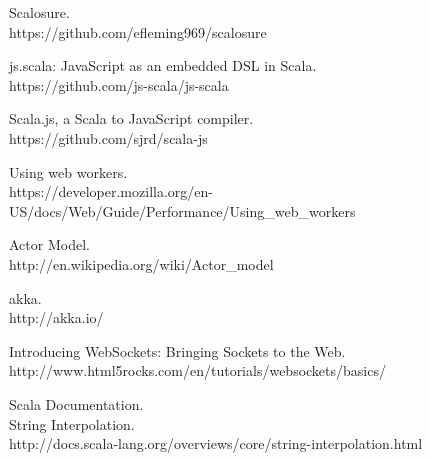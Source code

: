 \begin{thebibliography}{99}
  Scalosure.\\
  https://github.com/efleming969/scalosure
	
  js.scala: JavaScript as an embedded DSL in Scala.\\
  https://github.com/js-scala/js-scala
	
  Scala.js, a Scala to JavaScript compiler.\\
  https://github.com/sjrd/scala-js
	
  Using web workers.\\
  https://developer.mozilla.org/en-US/docs/Web/Guide/Performance/Using\_web\_workers
	
  Actor Model.\\
  http://en.wikipedia.org/wiki/Actor\_model
	
	akka.\\
	http://akka.io/
	
  Introducing WebSockets: Bringing Sockets to the Web.\\
	http://www.html5rocks.com/en/tutorials/websockets/basics/
	
  Scala Documentation.\\
	String Interpolation.\\
	http://docs.scala-lang.org/overviews/core/string-interpolation.html
	
\end{thebibliography}